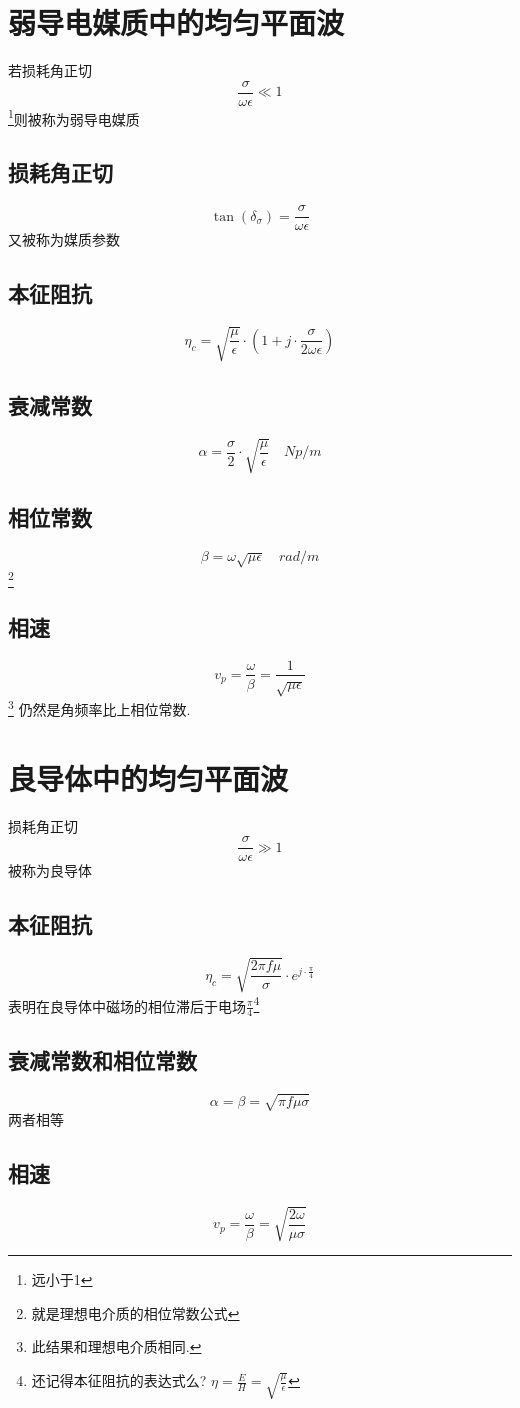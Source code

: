 \documentclass[a4paper]{report}
\begin{document}
\section{弱导电媒质中的均匀平面波}
若损耗角正切$$\frac{\sigma}{\omega\epsilon}\ll1$$\footnote{远小于1}则被称为弱导电媒质
\subsection{损耗角正切}
$$\tan(\delta_\sigma)=\frac{\sigma}{\omega\epsilon}$$
又被称为媒质参数
\subsection{本征阻抗}
$$\eta_c=\sqrt{\frac{\mu}{\epsilon}}\cdot (1+j\cdot\frac{\sigma}{2\omega\epsilon})$$
\subsection{衰减常数}
$$\alpha=\frac{\sigma}{2}\cdot\sqrt{\frac{\mu}{\epsilon}}\quad Np/m$$
\subsection{相位常数}
$$\beta=\omega\sqrt{\mu\epsilon}\quad rad/m$$\footnote{就是理想电介质的相位常数公式}
\subsection{相速}
$$v_p=\frac{\omega}{\beta}=\frac{1}{\sqrt{\mu\epsilon}}$$\footnote{此结果和理想电介质相同. }
仍然是角频率比上相位常数. 
\section{良导体中的均匀平面波}
损耗角正切$$\frac{\sigma}{\omega\epsilon}\gg 1$$被称为良导体
\subsection{本征阻抗}
$$\eta_c=\sqrt{\frac{2\pi f\mu}{\sigma}}\cdot e^{j\cdot\frac{\pi}{4}}$$
表明在良导体中磁场的相位滞后于电场$\frac{\pi}{4}$\footnote{还记得本征阻抗的表达式么? $\eta=\frac{E}{H}=\sqrt{\frac{\mu}{\epsilon}}$}
\subsection{衰减常数和相位常数}
$$\alpha=\beta=\sqrt{\pi f\mu\sigma}$$
两者相等
\subsection{相速}
$$v_p=\frac{\omega}{\beta}=\sqrt{\frac{2\omega}{\mu\sigma}}$$
\end{document}
